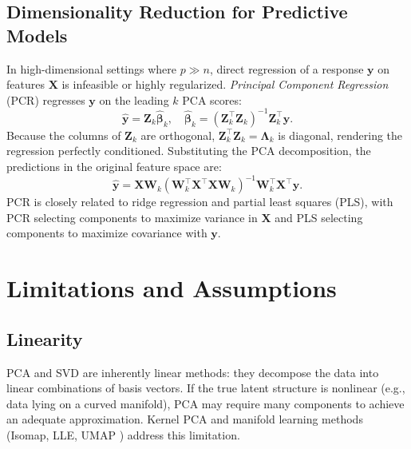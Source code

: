 \documentclass[conference]{IEEEtran}
\begin{document}
\subsection{Dimensionality Reduction for Predictive Models}

In high-dimensional settings where $p \gg n$, direct regression of a response $\mathbf{y}$ on features $\mathbf{X}$ is infeasible or highly regularized. \emph{Principal Component Regression} (PCR) \cite{hotelling1957} regresses $\mathbf{y}$ on the leading $k$ PCA scores:
\begin{equation}
\hat{\mathbf{y}} = \mathbf{Z}_k\hat{\bm{\beta}}_k, \quad \hat{\bm{\beta}}_k = (\mathbf{Z}_k^\top\mathbf{Z}_k)^{-1}\mathbf{Z}_k^\top\mathbf{y}.
\end{equation}
Because the columns of $\mathbf{Z}_k$ are orthogonal, $\mathbf{Z}_k^\top\mathbf{Z}_k = \mathbf{\Lambda}_k$ is diagonal, rendering the regression perfectly conditioned. Substituting the PCA decomposition, the predictions in the original feature space are:
\begin{equation}
\hat{\mathbf{y}} = \mathbf{X}\mathbf{W}_k(\mathbf{W}_k^\top\mathbf{X}^\top\mathbf{X}\mathbf{W}_k)^{-1}\mathbf{W}_k^\top\mathbf{X}^\top\mathbf{y}.
\end{equation}
PCR is closely related to ridge regression \cite{hastie2009} and partial least squares (PLS), with PCR selecting components to maximize variance in $\mathbf{X}$ and PLS selecting components to maximize covariance with $\mathbf{y}$.

\section{Limitations and Assumptions}
\label{sec:limitations}

\subsection{Linearity}

PCA and SVD are inherently linear methods: they decompose the data into linear combinations of basis vectors. If the true latent structure is nonlinear (e.g., data lying on a curved manifold), PCA may require many components to achieve an adequate approximation. Kernel PCA \cite{scholkopf1998} and manifold learning methods (Isomap, LLE, UMAP \cite{mcinnes2018}) address this limitation.
\end{document}
